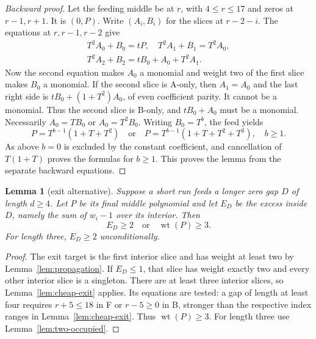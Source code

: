 \documentclass{article}
\newtheorem{lemma}{Lemma}
\DeclareMathOperator{\wt}{wt}
\begin{document}
\begin{proof}[Backward proof]
  Let the feeding middle be at \(r\), with \(4 \le r \le 17\) and zeros at \(r - 1, r + 1\).
  It is \((0, P)\). Write \((A_i, B_i)\) for the slices at \(r - 2 - i\). The equations at
  \(r, r - 1, r - 2\) give
  \begin{equation}\label{eq:cheap-backward}
    \begin{gathered}
      T^2 A_0 + B_0 = tP, \quad T^2 A_1 + B_1 = T^2 A_0, \\
      T^2 A_2 + B_2 = t B_0 + A_0 + T^2 A_1.
    \end{gathered}
  \end{equation}
  Now the second equation makes \(A_0\) a monomial and weight two of the first slice makes
  \(B_0\) a monomial. If the second slice is A-only, then \(A_1 = A_0\) and the last right
  side is \(t B_0 + (1 + T^2)A_0\), of even coefficient parity. It cannot be a monomial.
  Thus the second slice is B-only, and \(t B_0 + A_0\) must be a monomial. Necessarily
  \(A_0 = T B_0\) or \(A_0 = T^2 B_0\). Writing \(B_0 = T^b\), the feed yields
  \begin{equation}
    P = T^{b-1}(1 + T + T^2) \quad \text{or} \quad
    P = T^{b-1}(1 + T + T^2 + T^3), \quad b \ge 1.
  \end{equation}
  As above \(b = 0\) is excluded by the constant coefficient, and cancellation of
  \(T(1 + T)\) proves the formulas for \(b \ge 1\). This proves the lemma from the separate
  backward equations.
\end{proof}

\begin{lemma}[exit alternative]\label{lem:exit-alternative}
  Suppose a short run feeds a longer zero gap \(D\) of length \(d \ge 4\). Let \(P\) be its
  final middle polynomial and let \(E_D\) be the excess inside \(D\), namely the sum of
  \(w_i - 1\) over its interior. Then
  \begin{equation}\label{eq:exit-alternative}
    E_D \ge 2 \quad \text{or} \quad \wt(P) \ge 3.
  \end{equation}
  For length three, \(E_D \ge 2\) unconditionally.
\end{lemma}

\begin{proof}
  The exit target is the first interior slice and has weight at least two by
  Lemma~\ref{lem:propagation}. If \(E_D \le 1\), that slice has weight exactly two and every
  other interior slice is a singleton. There are at least three interior slices, so
  Lemma~\ref{lem:cheap-exit} applies. Its equations are tested: a gap of length at least four
  requires \(r + 5 \le 18\) in F or \(r - 5 \ge 0\) in B, stronger than the respective index
  ranges in Lemma~\ref{lem:cheap-exit}. Thus \(\wt(P) \ge 3\). For length three use
  Lemma~\ref{lem:two-occupied}.
\end{proof}
\end{document}
